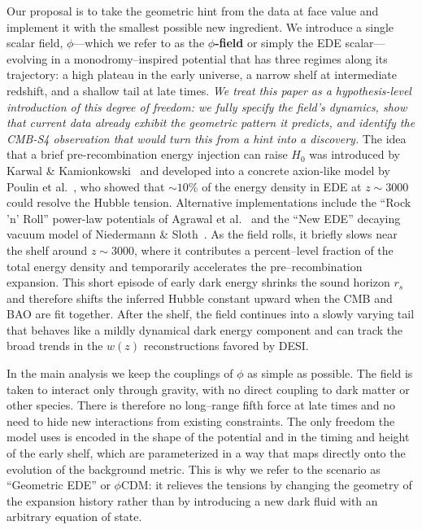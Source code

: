 \documentclass[a4paper,11pt]{article}
\begin{document}
Our proposal is to take the geometric hint from the data at face value and implement it with the smallest possible new ingredient. We introduce a single scalar field, $\phi$---which we refer to as the \textbf{$\phi$-field} or simply the EDE scalar---evolving in a monodromy--inspired potential that has three regimes along its trajectory: a high plateau in the early universe, a narrow shelf at intermediate redshift, and a shallow tail at late times. \textit{We treat this paper as a hypothesis-level introduction of this degree of freedom: we fully specify the field's dynamics, show that current data already exhibit the geometric pattern it predicts, and identify the CMB-S4 observation that would turn this from a hint into a discovery.} The idea that a brief pre-recombination energy injection can raise $H_0$ was introduced by Karwal \& Kamionkowski~\cite{Karwal_Kamionkowski} and developed into a concrete axion-like model by Poulin et al.~\cite{Poulin_EDE}, who showed that $\sim 10\%$ of the energy density in EDE at $z \sim 3000$ could resolve the Hubble tension. Alternative implementations include the ``Rock 'n' Roll'' power-law potentials of Agrawal et al.~\cite{Agrawal_RnR} and the ``New EDE'' decaying vacuum model of Niedermann \& Sloth~\cite{Niedermann_NewEDE}. As the field rolls, it briefly slows near the shelf around $z \sim 3000$, where it contributes a percent--level fraction of the total energy density and temporarily accelerates the pre--recombination expansion. This short episode of early dark energy shrinks the sound horizon $r_s$ and therefore shifts the inferred Hubble constant upward when the CMB and BAO are fit together. After the shelf, the field continues into a slowly varying tail that behaves like a mildly dynamical dark energy component and can track the broad trends in the $w(z)$ reconstructions favored by DESI.

In the main analysis we keep the couplings of $\phi$ as simple as possible. The field is taken to interact only through gravity, with no direct coupling to dark matter or other species. There is therefore no long--range fifth force at late times and no need to hide new interactions from existing constraints. The only freedom the model uses is encoded in the shape of the potential and in the timing and height of the early shelf, which are parameterized in a way that maps directly onto the evolution of the background metric. This is why we refer to the scenario as ``Geometric EDE'' or $\phi$CDM: it relieves the tensions by changing the geometry of the expansion history rather than by introducing a new dark fluid with an arbitrary equation of state.
\end{document}
